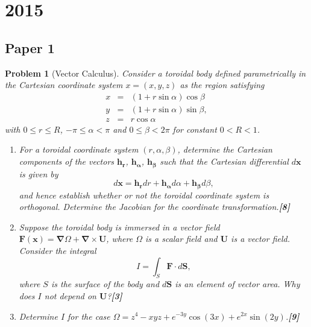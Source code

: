 \documentclass[a4paper]{article}
\theoremstyle{new}
\newtheorem{qns}{Problem}[section]
\begin{document}
\section{2015}
\subsection{Paper 1}
\begin{qns}[Vector Calculus]
Consider a toroidal body defined parametrically in the Cartesian coordinate system $x = (x, y, z)$ as the region satisfying
\begin{eqnarray}
x &=& (1 + r\sin\alpha) \cos\beta\nonumber\\
y&=&(1 + r\sin \alpha) \sin\beta ,\nonumber\\
z&=&r\cos\alpha\nonumber
\end{eqnarray}
with $0\leq r\leq R$, $−\pi\leq\alpha<\pi$ and $0\leq\beta<2\pi$ for constant $0 < R < 1$.
\begin{enumerate}[label=(\alph*)]
    \item For a toroidal coordinate system $(r, \alpha, \beta)$, determine the Cartesian components of the vectors $\mathbf{h_r}$, $\mathbf{h_\alpha}$, $\mathbf{h_\beta}$ such that the Cartesian differential $d\mathbf{x}$ is given by
$$d\mathbf{x} = \mathbf{h_r}dr +\mathbf{h_\alpha}d\alpha + \mathbf{h_\beta}d\beta,$$
and hence establish whether or not the toroidal coordinate system is orthogonal. Determine the Jacobian for the coordinate transformation.\hfill \textbf{[8]}
\item Suppose the toroidal body is immersed in a vector field $\mathbf{F}(\mathbf{x})=\boldsymbol{\nabla}\Omega+\boldsymbol{\nabla}\times\mathbf{U}$, where $\Omega$ is a scalar field and $\mathbf{U}$ is a vector field. Consider the integral
$$I=\int_S\mathbf{F}\cdot d\mathbf{S},$$
where $S$ is the surface of the body and $d\mathbf{S}$ is an element of vector area. Why does $I$ not depend on $\mathbf{U}$?\hfill \textbf{[3]}
\item Determine $I$ for the case $\Omega=z^4-xyz+e^{-3y}\cos(3x)+e^{2x}\sin(2y)$.\hfill \textbf{[9]}
\end{enumerate}
\end{qns}
\end{document}

